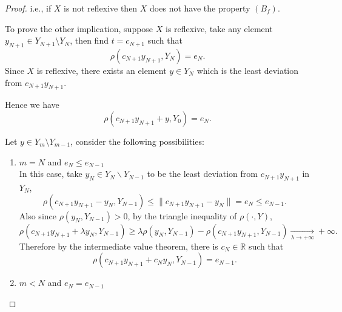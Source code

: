 \documentclass[12pt, reqno]{amsart}
\theoremstyle{definition}
\theoremstyle{remark}
\numberwithin{equation}{section}
\begin{document}
\begin{proof}

i.e., if $X$ is not reflexive  then $X$ does not have the property $(B_f)$.


To prove the other implication, suppose $X$ is reflexive, take any element $y_{N+1} \in Y_{N+1} \setminus Y_N$, then find $t=c_{N+1}$ such that $$ \rho( c_{N+1} y_{N+1}, Y_N)= e_N.$$ Since $X$ is reflexive, there exists an element $y\in Y_N$ which is the least deviation from $ c_{N+1} y_{N+1}$.

Hence we have $$ \rho( c_{N+1} y_{N+1}+ y , Y_0)= e_N.$$

Let $y\in Y_m\setminus Y_{m-1}$, consider the following possibilities:
\begin{enumerate}
\renewcommand{\labelenumi}{\alph{enumi})}

\item$m = N$ and $e_N \le e_{N-1}$\\


In this case, take $y_N\in Y_N\backslash Y_{N-1}$ to be the least deviation from $c_{N+1}y_{N+1}$ in $Y_N$,
$$
 \rho(c_{N+1}y_{N+1}-y_N, Y_{N-1} )\le \|c_{N+1}y_{N+1}-y_N\|=e_N\le e_{N-1}.
$$
Also since $\rho(y_N, Y_{N-1} )>0$, by the triangle inequality of $\rho(\cdot,Y)$, 
$$
 \rho(c_{N+1}y_{N+1}+\lambda y_N, Y_{N-1} )\ge  \lambda \rho(y_N, Y_{N-1} )- \rho(c_{N+1}y_{N+1}, Y_{N-1} )\xrightarrow[\lambda\to+\infty]{}+\infty.
$$
Therefore by the intermediate value theorem, there is $c_{N}\in\mathbb R$ such that
$$
\rho(c_{N+1}y_{N+1}+c_N y_N, Y_{N-1} )=e_{N-1}.
$$
\item $m < N$ and $e_N = e_{N-1}$\\


\end{enumerate}
\end{proof}
\end{document}
